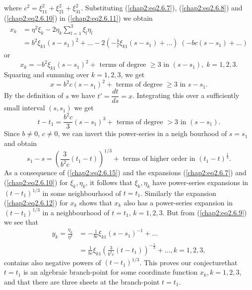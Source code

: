 where $c^2 = \xi^2_{11} + \xi^2_{21} + \xi^2_{31}$. Substituting (\ref{chap2:eq2.6.7}), (\ref{chap2:eq2.6.8}) and (\ref{chap2:eq2.6.10}) in (\ref{chap2:eq2.6.11}) we obtain
\begin{align*}
x_k & = \eta^2 \xi_k - 2 \eta_k \sum\limits^3_{l=1} \xi_l \eta_l\\
& = b^2 \xi_{k1}(s-s_1)^2 + \ldots -2 (-\frac{b}{c} \xi_{k1} (s-s_1) + \ldots) \; (-bc (s-s_1) + \ldots )
\end{align*}
or\pageoriginale
\begin{equation*}
x_k = - b^2\xi_{k1} (s-s_1)^2 + \text{ terms of degree } \geq 3 \text{ in } (s-s_1), \; k = 1,2,3. \tag{2.6.12}\label{chap2:eq2.6.12} 
\end{equation*}
Squaring and summing over $k=1,2,3$, we get 
\begin{equation*}
x = b^2 c (s-s_1)^2 + \text{ terms of degree } \geq 3 \text{ in } s - s_1. \tag{2.6.13}\label{chap2:eq2.6.13} 
\end{equation*}
By the definition of $s$ we have $t' =\dfrac{dt}{ds} = x$. Integrating this over a sufficiently small interval $(s, s_1)$ we get
\begin{equation*}
t - t_1 = \frac{b^2 c}{3}(s-s_1)^3 + \text{ terms of degree } > 3 \text{ in } (s-s_1). \tag{2.6.14}\label{chap2:eq2.6.14} 
\end{equation*}
Since $b \neq 0$, $c \neq 0$, we can invert this power-series in a neigh bourhood of $s = s_1$ and obtain
\begin{equation*}
s_1 - s= \left(\frac{3}{b^2c} (t_1 -t) \right)^{1/3} + \text{ terms of higher order in } (t_1 -t)^{\frac{1}{3}}.\tag{2.6.15}\label{chap2:eq2.6.15} 
\end{equation*}
As a consequence of (\ref{chap2:eq2.6.15}) and the expansions (\ref{chap2:eq2.6.7}) and (\ref{chap2:eq2.6.10}) for $\xi_k, \eta_k$, it follows that $\xi_k, \eta_k$ have power-series expansions in $(t-t_1)^{1/3}$ in some neighbourhood of $t = t_1$. Similarly the expansion (\ref{chap2:eq2.6.12}) for $x_k$ shows that $x_k$ also has a power-series expansion in $(t-t_1)^{1/3}$ in a neighbourhood of $t = t_1$, $k = 1,2,3$. But from (\ref{chap2:eq2.6.9}) we see that 
\begin{align*}
y_k = \frac{\eta_k}{\eta^2} & = - \frac{1}{bc} \xi_{k1} (s-s_1)^{-1} + \ldots \\
& = \frac{1}{bc} \xi_{k1} (\frac{3}{b^2c} (t-t_1))^{-\frac{1}{3}} + \ldots, k = 1,2,3,
\end{align*}
contains also negative powers of $(t-t_1)^{1/3}$. This proves our conjecture\pageoriginale that $t =t_1$ is an algebraic branch-point for some coordinate function $x_k, k = 1,2,3 $, and that there are three sheets at the branch-point $t = t_1$.

